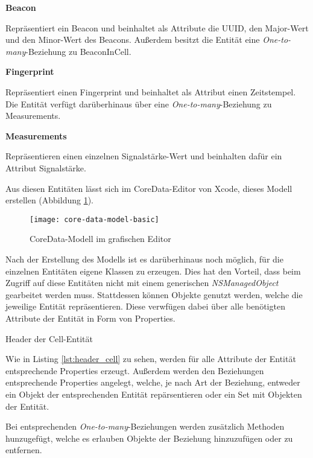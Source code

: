 \textbf{Beacon}

Repräsentiert ein Beacon und beinhaltet als Attribute die UUID, den Major-Wert und den Minor-Wert des Beacons.
Außerdem besitzt die Entität eine \emph{One-to-many}-Beziehung zu BeaconInCell.

\textbf{Fingerprint}

Repräsentiert einen Fingerprint und beinhaltet als Attribut einen Zeitstempel.
Die Entität verfügt darüberhinaus über eine \emph{One-to-many}-Beziehung zu Measurements.


\textbf{Measurements}

Repräsentieren einen einzelnen Signalstärke-Wert und beinhalten dafür ein Attribut Signalstärke.



Aus diesen Entitäten lässt sich im CoreData-Editor von Xcode, dieses Modell erstellen (Abbildung \ref{core-data-model-basic}).

\begin{figure}[htb!]
		\centering
	\texttt{[image: core-data-model-basic]}
	\caption{CoreData-Modell im grafischen Editor}
	\label{core-data-model-basic}
\end{figure}


Nach der Erstellung des Modells ist es darüberhinaus noch möglich, für die einzelnen Entitäten eigene Klassen zu erzeugen. Dies hat den Vorteil, dass beim Zugriff auf diese Entitäten nicht mit einem generischen \emph{NSManagedObject} gearbeitet werden muss. Stattdessen können Objekte genutzt werden, welche die jeweilige Entität repräsentieren. Diese verwfügen dabei über alle benötigten Attribute der Entität in Form von Properties.

\begin{listing}[htb! breaklines=true]
    \caption{Header der Cell-Entität}
	\label{lst:header_cell}
\end{listing}

Wie in Listing \ref{lst:header_cell} zu sehen, werden für alle Attribute der Entität entsprechende Properties erzeugt. Außerdem werden den Beziehungen entsprechende Properties angelegt, welche, je nach Art der Beziehung, entweder ein Objekt der entsprechenden Entität repärsentieren oder ein Set mit Objekten der Entität.

Bei entsprechenden \emph{One-to-many}-Beziehungen werden zusätzlich Methoden hunzugefügt, welche es erlauben Objekte der Beziehung hinzuzufügen oder zu entfernen.

